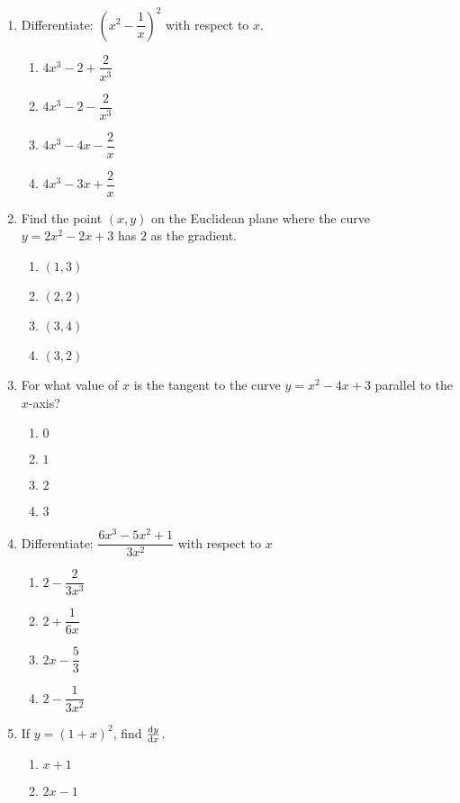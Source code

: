 \begin{multicols}{2}
\begin{enumerate}[label={\arabic*.}]
    \item Differentiate: \({\left({x}^{2} - \dfrac{1}{x}\right)}^2\) with respect to \(x\).
      \begin{enumerate}[label={\Alph*.}]
        \item \(4{x}^{3} - 2 + \dfrac{2}{{x}^{3}}\)
        \item \(4{x}^{3} - 2 - \dfrac{2}{{x}^{3}}\)
        \item \(4{x}^{3} - 4x - \dfrac{2}{x}\)
        \item \(4{x}^{3} - 3x + \dfrac{2}{x}\)
      \end{enumerate}
    \item Find the point \((x,y)\) on the Euclidean plane where the curve \(y = 2x^{2} - 2x +3\) has \(2\) as the gradient.
      \begin{enumerate}[label={\Alph*.}]
        \item \((1, 3)\)
        \item \((2, 2)\)
        \item \((3, 4)\)
        \item \((3, 2)\)
      \end{enumerate}
    \item For what value of \(x\) is the tangent to the curve \(y = x^{2} - 4x + 3\) parallel to the \(x\)-axis?
      \begin{enumerate}[label={\Alph*.}]
        \item \(0\)
        \item \(1\)
        \item \(2\)
        \item \(3\)
      \end{enumerate}
    \item Differentiate: \(\dfrac{6x^{3} - 5x^{2} + 1}{3x^{2}}\) with respect to \(x\)
      \begin{enumerate}[label={\Alph*.}]
        \item \(2 - \dfrac{2}{3{x}^{3}}\)
        \item \(2 + \dfrac{1}{6x}\)
        \item \(2x - \dfrac{5}{3}\)
        \item \(2 - \dfrac{1}{3x^2}\)
      \end{enumerate}
    \item If \(y = {(1+x)}^{2}\), find \( \frac{\mathrm{d}y}{\mathrm{d}x} \).
      \begin{enumerate}[label={\Alph*.}]
        \item \(x + 1\)
        \item \(2x - 1\)

\end{enumerate}
\end{enumerate}
\end{multicols}
